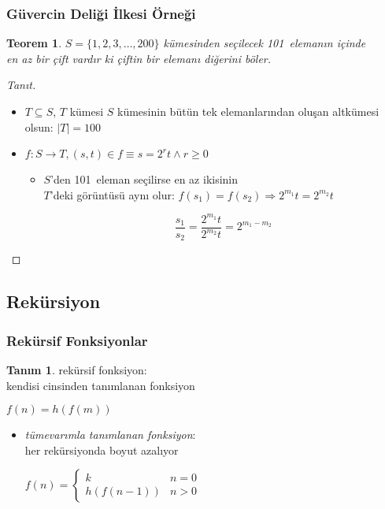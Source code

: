 \documentclass[dvipsnames]{beamer}
\theoremstyle{definition}
\newtheorem{tanim}[theorem]{Tanım}
\theoremstyle{example}
\theoremstyle{plain}
\newtheorem{teorem}[theorem]{Teorem}
\begin{document}
\begin{frame}
  \frametitle{Güvercin Deliği İlkesi Örneği}

  \begin{teorem}
    $S = \{1,2,3,\dots,200\}$ kümesinden seçilecek 101~elemanın içinde\\
    en az bir çift vardır ki çiftin bir elemanı diğerini böler.
  \end{teorem}

  \pause
  \begin{proof}[Tanıt]
    \begin{itemize}
      \item $T \subseteq S$, $T$ kümesi $S$ kümesinin bütün tek elemanlarından
        oluşan altkümesi olsun: $|T|=100$

      \pause
      \item $f: S \rightarrow T, (s, t) \in f \equiv s = 2^r t \wedge r \geq 0$
      \begin{itemize}
        \item $S$'den 101~eleman seçilirse en az ikisinin\\
          $T$'deki görüntüsü aynı olur:
          $f(s_1)=f(s_2) \Rightarrow 2^{m_1} t = 2^{m_2} t$

        \pause
        \[
          \frac {s_1} {s_2} = \frac {2^{m_1} t} {2^{m_2} t} = 2^{m_1 - m_2}
        \]
      \end{itemize}
    \end{itemize}
  \end{proof}
\end{frame}

\subsection{Rekürsiyon}

\begin{frame}
  \frametitle{Rekürsif Fonksiyonlar}

  \begin{tanim}
    \alert{rekürsif fonksiyon}:\\
      kendisi cinsinden tanımlanan fonksiyon

    \medskip
    $f(n) = h(f(m))$
  \end{tanim}

  \begin{itemize}
    \item \emph{tümevarımla tanımlanan fonksiyon}:\\
      her rekürsiyonda boyut azalıyor

    \medskip
    $f(n) = \left\{
      \begin{array}{ll}
        k         & n = 0\\
        h(f(n-1)) & n > 0
      \end{array}
    \right.$
  \end{itemize}
\end{frame}
\end{document}
